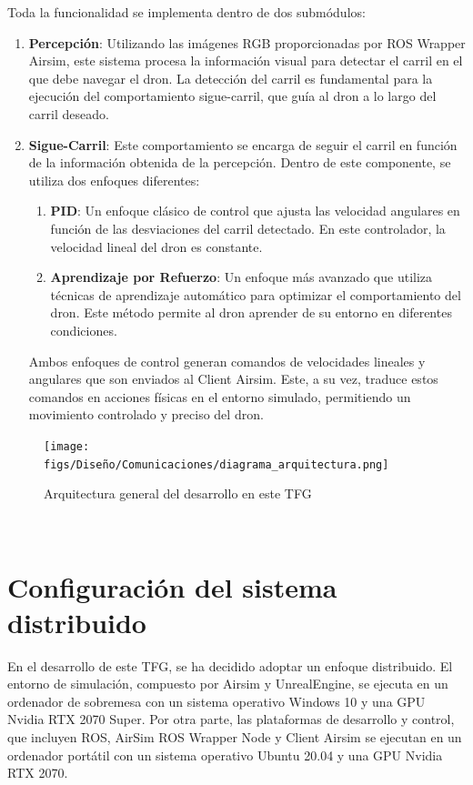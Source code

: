 Toda la funcionalidad se implementa dentro de dos submódulos:
\begin{enumerate}
  \item \textbf{Percepción}: Utilizando las imágenes RGB proporcionadas por ROS Wrapper Airsim, este sistema procesa la información
  visual para detectar el carril en el que debe navegar el dron. La detección del carril es fundamental para la ejecución del comportamiento sigue-carril, que guía al dron 
  a lo largo del carril deseado. 
  \item \textbf{Sigue-Carril}: Este comportamiento se encarga de seguir el carril en función de la información obtenida de la percepción. Dentro de este componente, se 
  utiliza dos enfoques diferentes: 
  \begin{enumerate}
    \item \textbf{PID}: Un enfoque clásico de control que ajusta las velocidad angulares en función de las desviaciones del carril detectado. En este controlador, la velocidad lineal 
    del dron es constante.
    \item \textbf{Aprendizaje por Refuerzo}: Un enfoque más avanzado que utiliza técnicas de aprendizaje automático para optimizar el comportamiento del dron. Este método 
    permite al dron aprender de su entorno en diferentes condiciones. 
  \end{enumerate}

  Ambos enfoques de control generan comandos de velocidades lineales y angulares que son enviados al Client Airsim. Este, a su vez, traduce estos comandos en acciones físicas 
  en el entorno simulado, permitiendo un movimiento controlado y preciso del dron. 
\end{enumerate}

\begin{figure} [H]
    \begin{center}
      \texttt{[image: figs/Diseño/Comunicaciones/diagrama\_arquitectura.png]}
    \end{center}
    \caption{Arquitectura general del desarrollo en este TFG}
    \label{fig:infraestructura}
  \end{figure}\

\section{Configuración del sistema distribuido}
\label{distribución}
En el desarrollo de este TFG, se ha decidido adoptar un enfoque distribuido. El entorno de simulación, compuesto por Airsim y UnrealEngine, se ejecuta en un ordenador de sobremesa con un sistema 
operativo Windows 10 y una GPU Nvidia RTX 2070 Super. Por otra parte, las plataformas de desarrollo y control, que incluyen ROS, AirSim ROS Wrapper Node y Client Airsim se ejecutan en un ordenador
portátil con un sistema operativo Ubuntu 20.04 y una GPU Nvidia RTX 2070.

